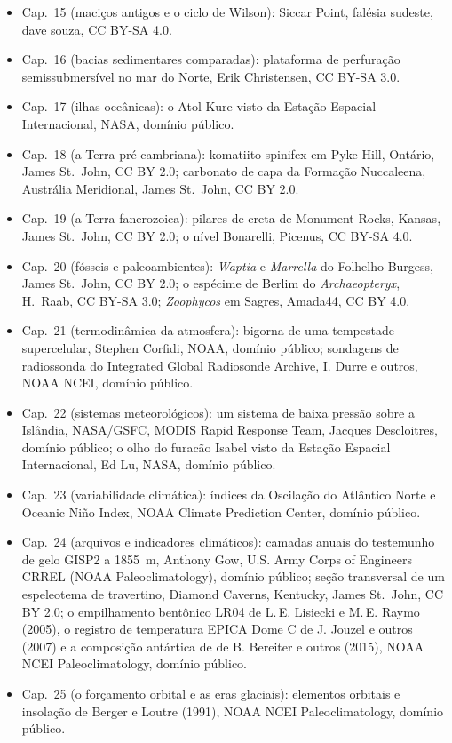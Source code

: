 \begin{itemize}
  \item Cap.~15 (maciços antigos e o ciclo de Wilson): Siccar Point, falésia sudeste, dave souza, CC BY-SA 4.0.
  \item Cap.~16 (bacias sedimentares comparadas): plataforma de perfuração semissubmersível no mar do Norte, Erik Christensen, CC BY-SA 3.0.
  \item Cap.~17 (ilhas oceânicas): o Atol Kure visto da Estação Espacial Internacional, NASA, domínio público.
  \item Cap.~18 (a Terra pré-cambriana): komatiito spinifex em Pyke Hill, Ontário, James St.~John, CC BY 2.0; carbonato de capa da Formação Nuccaleena, Austrália Meridional, James St.~John, CC BY 2.0.
  \item Cap.~19 (a Terra fanerozoica): pilares de creta de Monument Rocks, Kansas, James St.~John, CC BY 2.0; o nível Bonarelli, Picenus, CC BY-SA 4.0.
  \item Cap.~20 (fósseis e paleoambientes): \emph{Waptia} e \emph{Marrella} do Folhelho Burgess, James St.~John, CC BY 2.0; o espécime de Berlim do \emph{Archaeopteryx}, H.~Raab, CC BY-SA 3.0; \emph{Zoophycos} em Sagres, Amada44, CC BY 4.0.
  \item Cap.~21 (termodinâmica da atmosfera): bigorna de uma tempestade supercelular, Stephen Corfidi, NOAA, domínio público; sondagens de radiossonda do Integrated Global Radiosonde Archive, I. Durre e outros, NOAA NCEI, domínio público.
  \item Cap.~22 (sistemas meteorológicos): um sistema de baixa pressão sobre a Islândia, NASA/GSFC, MODIS Rapid Response Team, Jacques Descloitres, domínio público; o olho do furacão Isabel visto da Estação Espacial Internacional, Ed Lu, NASA, domínio público.
  \item Cap.~23 (variabilidade climática): índices da Oscilação do Atlântico Norte e Oceanic Niño Index, NOAA Climate Prediction Center, domínio público.
  \item Cap.~24 (arquivos e indicadores climáticos): camadas anuais do testemunho de gelo GISP2 a 1855~m, Anthony Gow, U.S. Army Corps of Engineers CRREL (NOAA Paleoclimatology), domínio público; seção transversal de um espeleotema de travertino, Diamond Caverns, Kentucky, James St.~John, CC BY 2.0; o empilhamento bentônico LR04 de L.\,E. Lisiecki e M.\,E. Raymo (2005), o registro de temperatura EPICA Dome C de J. Jouzel e outros (2007) e a composição antártica de  de B. Bereiter e outros (2015), NOAA NCEI Paleoclimatology, domínio público.
  \item Cap.~25 (o forçamento orbital e as eras glaciais): elementos orbitais e insolação de Berger e Loutre (1991), NOAA NCEI Paleoclimatology, domínio público.

\end{itemize}
